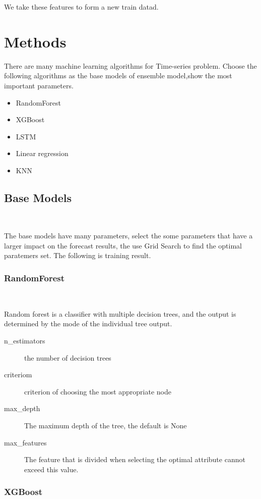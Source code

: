 We take these features 
to form a new train datad.


\section{Methods}

There are many machine learning algorithms 
for Time-series problem. 
Choose the following algorithms
as the base models of ensemble model,show the most important parameters.

\begin{itemize}
	\item RandomForest 
	\item XGBoost
	\item LSTM
	\item Linear regression
	\item KNN
\end{itemize}
\subsection{Base Models}
\

The base models have many parameters,
select the some parameters that 
have a larger impact on 
the forecast results,
the use Grid Search to find 
the optimal paratemers set.	
The following is training result. 
\subsubsection{RandomForest}
\

Random forest is a classifier with 
multiple decision trees, and
the output is determined by 
the mode of the individual tree output.


\begin{description}
	\item[n_estimators] the number of decision trees
	\item[criteriom] criterion of choosing 
	the most appropriate node
	\item[max_depth] The maximum depth of the tree, 
	the default is None 
	\item[max_features] The feature that is divided 
	when selecting the optimal attribute 
	cannot exceed this value.
\end{description}
                  
	
\subsubsection{XGBoost}
\
 
